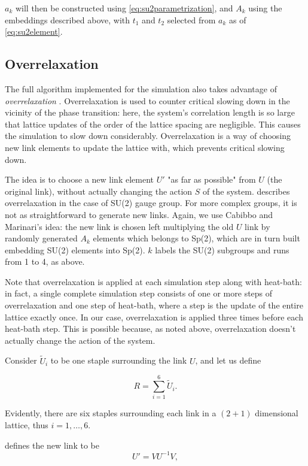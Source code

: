 \documentclass[reqno,12pt]{article}
\numberwithin{equation}{section}
\begin{document}
$a_k$ will then be constructed using \eqref{eq:su2parametrization}, and $A_k$ using the embeddings described
above, with $t_1$ and $t_2$ selected from $a_k$ as of \eqref{eq:su2element}.

\subsection{Overrelaxation}

The full algorithm implemented for the simulation also takes advantage of \textit{overrelaxation} \cite{montvay}.
Overrelaxation is used to counter critical slowing down in the vicinity of the phase transition: here,
the system's correlation length is so large that lattice updates of the order of the lattice spacing are
negligible. This causes the simulation to slow down considerably. 
Overrelaxation is a way of choosing new link elements to update the lattice with, which prevents critical
slowing down. 

The idea is to choose a new link element $U'$ "as far as possible" from $U$ (the original link), without actually changing the
action $S$ of the system. \cite{montvay} describes overrelaxation in the case of SU(2) gauge group. For more
complex groups, it is not as straightforward to generate new links. Again, we use Cabibbo and Marinari's idea:
the new link is chosen left multiplying the old $U$ link by randomly generated $A_k$ elements which belongs
to Sp(2), which are in turn built embedding SU(2) elements into Sp(2). $k$ labels the SU(2) subgroups and runs
from 1 to 4, as above. 

Note that overrelaxation is applied at each simulation step along with heat-bath: in fact,
a single complete simulation step consists of one or more steps of overrelaxation and one step of heat-bath, where
a step is the update of the entire lattice exactly once. In our case, overrelaxation is applied three times
before each heat-bath step. This is possible because, as noted above, overrelaxation doesn't actually change
the action of the system.

Consider $\widetilde{U}_i$ to be one staple surrounding the link $U$, and let us define

\begin{equation}
	R = \sum_{i = 1}^6 \widetilde{U}_i.
\end{equation}

Evidently, there are six staples surrounding each link in a $(2+1)$ dimensional lattice, thus $i = 1,\dots,6$.

\cite{montvay} defines the new link to be
\begin{equation}
	U' = V U^{-1} V,
\end{equation}
\end{document}
